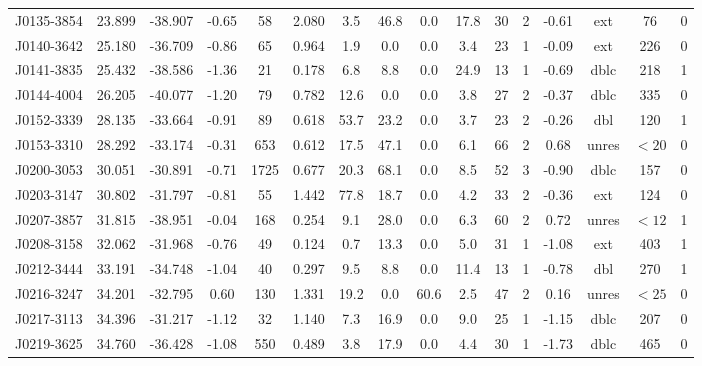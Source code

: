 \documentclass{mnras}
\begin{document}
\begin{table*}
\begin{tabular}{cccccccccccccccc}
J0135-3854 & 23.899 & -38.907 & -0.65 & 58 & 2.080 & 3.5 & 46.8 & 0.0 & 17.8 & 30 & 2 & -0.61 & ext & 76 & 0 \\ 

J0140-3642 & 25.180 & -36.709 & -0.86 & 65 & 0.964 & 1.9 & 0.0 & 0.0 & 3.4 & 23 & 1 & -0.09 & ext & 226 & 0 \\ 

J0141-3835 & 25.432 & -38.586 & -1.36 & 21 & 0.178 & 6.8 & 8.8 & 0.0 & 24.9 & 13 & 1 & -0.69 & dblc & 218 & 1 \\ 

J0144-4004 & 26.205 & -40.077 & -1.20 & 79 & 0.782 & 12.6 & 0.0 & 0.0 & 3.8 & 27 & 2 & -0.37 & dblc & 335 & 0 \\ 

J0152-3339 & 28.135 & -33.664 & -0.91 & 89 & 0.618 & 53.7 & 23.2 & 0.0 & 3.7 & 23 & 2 & -0.26 & dbl & 120 & 1 \\ 

J0153-3310 & 28.292 & -33.174 & -0.31 & 653 & 0.612 & 17.5 & 47.1 & 0.0 & 6.1 & 66 & 2 & 0.68 & unres & $<20$ & 0 \\ 

J0200-3053 & 30.051 & -30.891 & -0.71 & 1725 & 0.677 & 20.3 & 68.1 & 0.0 & 8.5 & 52 & 3 & -0.90 & dblc & 157 & 0 \\ 

J0203-3147 & 30.802 & -31.797 & -0.81 & 55 & 1.442 & 77.8 & 18.7 & 0.0 & 4.2 & 33 & 2 & -0.36 & ext & 124 & 0 \\ 

J0207-3857 & 31.815 & -38.951 & -0.04 & 168 & 0.254 & 9.1 & 28.0 & 0.0 & 6.3 & 60 & 2 & 0.72 & unres & $<12$ & 1 \\ 

J0208-3158 & 32.062 & -31.968 & -0.76 & 49 & 0.124 & 0.7 & 13.3 & 0.0 & 5.0 & 31 & 1 & -1.08 & ext & 403 & 1 \\ 

J0212-3444 & 33.191 & -34.748 & -1.04 & 40 & 0.297 & 9.5 & 8.8 & 0.0 & 11.4 & 13 & 1 & -0.78 & dbl & 270 & 1 \\ 

J0216-3247 & 34.201 & -32.795 & 0.60 & 130 & 1.331 & 19.2 & 0.0 & 60.6 & 2.5 & 47 & 2 & 0.16 & unres & $<25$ & 0 \\ 

J0217-3113 & 34.396 & -31.217 & -1.12 & 32 & 1.140 & 7.3 & 16.9 & 0.0 & 9.0 & 25 & 1 & -1.15 & dblc & 207 & 0 \\ 

J0219-3625 & 34.760 & -36.428 & -1.08 & 550 & 0.489 & 3.8 & 17.9 & 0.0 & 4.4 & 30 & 1 & -1.73 & dblc & 465 & 0 \\ 


\end{tabular}
\end{table*}
\end{document}
